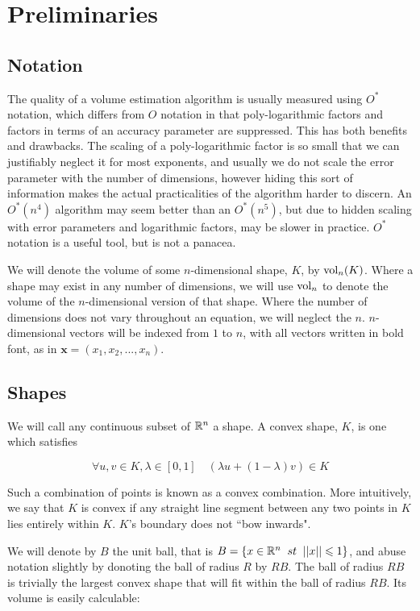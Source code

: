 \section{Preliminaries}
\subsection{Notation}

The quality of a volume estimation algorithm is usually measured using $O^{*}$ notation, which differs from $O$ notation in that poly-logarithmic factors and factors in terms of an accuracy parameter are suppressed. This has both benefits and drawbacks. The scaling of a poly-logarithmic factor is so small that we can justifiably neglect it for most exponents, and usually we do not scale the error parameter with the number of dimensions, however hiding this sort of information makes the actual practicalities of the algorithm harder to discern. An $O^{*}(n^4)$ algorithm may seem better than an $O^{*}(n^5)$, but due to hidden scaling with error parameters and logarithmic factors, may be slower in practice. $O^{*}$ notation is a useful tool, but is not a panacea.

We will denote the volume of some $n$-dimensional shape, $K$, by $\mbox{vol}_n(K)$. Where a shape may exist in any number of dimensions, we will use $\mbox{vol}_n$ to denote the volume of the $n$-dimensional version of that shape. Where the number of dimensions does not vary throughout an equation, we will neglect the $n$. $n$-dimensional vectors will be indexed from $1$ to $n$, with all vectors written in bold font, as in ${\bm x} = (x_1, x_2, ..., x_n)$.

\subsection{Shapes}

We will call any continuous subset of $\mathbb{R}^{n}$ a shape. A convex shape, $K$, is one which satisfies

$$
\forall u, v \in K, \lambda \in [0,1] \quad (\lambda u + (1-\lambda) v) \in K
$$

Such a combination of points is known as a convex combination. More intuitively, we say that $K$ is convex if any straight line segment between any two points in $K$ lies entirely within $K$. $K$'s boundary does not ``bow inwards".

We will denote by $B$ the unit ball, that is $B = \{x \in \mathbb{R}^n \;\; st \;\; ||x|| \leqslant 1\}$, and abuse notation slightly by donoting the ball of radius $R$ by $RB$. The ball of radius $RB$ is trivially the largest convex shape that will fit within the ball of radius $RB$. Its volume is easily calculable:

